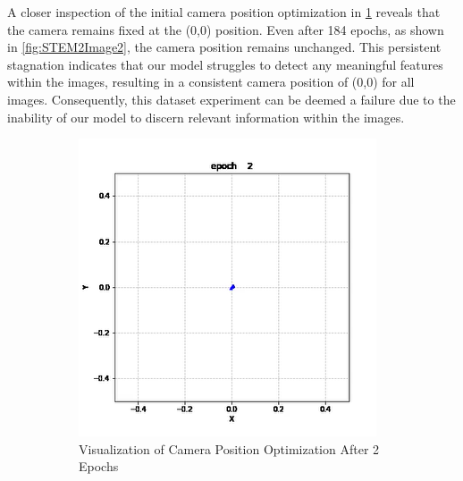 \vspace{10pt}
A closer inspection of the initial camera position optimization in \ref{fig:STEM2Image1} reveals that the camera remains fixed at the (0,0) position. Even after 184 epochs, as shown in \ref{fig:STEM2Image2}, the camera position remains unchanged. This persistent stagnation indicates that our model struggles to detect any meaningful features within the images, resulting in a consistent camera position of (0,0) for all images. Consequently, this dataset experiment can be deemed a failure due to the inability of our model to discern relevant information within the images.

\begin{figure}[H]
\centering
    \begin{subfigure}{.47\textwidth} %
        \includegraphics[width=\textwidth]{img/Results/STEM dataset 2/Screenshot 2023-12-23 164741.png}
        \caption{Visualization of Camera Position Optimization After 2 Epochs}
        \label{fig:STEM2Image1}
    \end{subfigure}
    \hfill
    \begin{subfigure}{.47\textwidth} %

\end{subfigure}
\end{figure}
